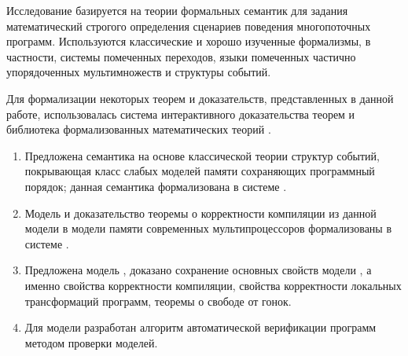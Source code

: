 Исследование базируется на теории формальных семантик для 
задания математический строгого определения сценариев поведения многопоточных программ. 
Используются классические и хорошо изученные формализмы, в частности, 
системы помеченных переходов, языки помеченных частично упорядоченных мультимножеств и структуры событий. 

Для формализации некоторых теорем и доказательств, представленных в данной работе, 
использовалась система интерактивного доказательства теорем \coq 
и библиотека формализованных математических теорий \mathcomp.


{}
\begin{enumerate}[beginpenalty=10000] %
  \item Предложена семантика на основе классической теории структур событий, 
    покрывающая класс слабых моделей памяти сохраняющих программный порядок;
    данная семантика формализована в системе \coq.
  \item Модель \Wkm и доказательство теоремы о корректности компиляции
    из данной модели в модели памяти современных мультипроцессоров формализованы в системе \coq.
  \item Предложена модель \WkmS, доказано сохранение основных свойств модели \Wkm,
    а именно свойства корректности компиляции,
    свойства корректности локальных трансформаций программ,
    теоремы о свободе от гонок.
  \item Для модели \WkmS разработан алгоритм автоматической 
    верификации программ методом проверки моделей.
\end{enumerate}

